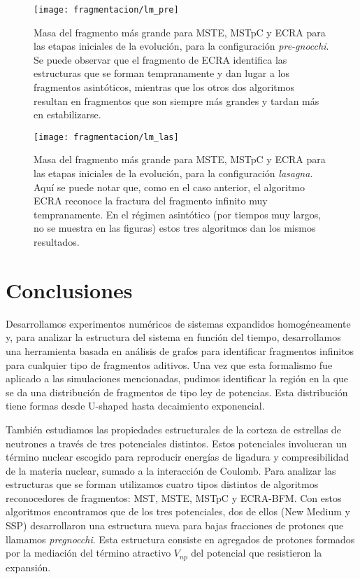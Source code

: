\begin{figure}[H]  \centering
  \texttt{[image: fragmentacion/lm\_pre]}
  \caption{Masa del fragmento más grande para MSTE, MSTpC y ECRA para las etapas iniciales de la evolución, para la configuración \emph{pre-gnocchi}.
    Se puede observar que el fragmento de ECRA identifica las estructuras que se forman tempranamente y dan lugar a los fragmentos asintóticos, mientras que los otros dos algoritmos resultan en fragmentos que son siempre más grandes y tardan más en estabilizarse.}
\label{fig:lm_pre}
\end{figure}

\begin{figure}[H]  \centering
  \texttt{[image: fragmentacion/lm\_las]}
  \caption{Masa del fragmento más grande para MSTE, MSTpC y ECRA para las etapas iniciales de la evolución, para la configuración \emph{lasagna}.
    Aquí se puede notar que, como en el caso anterior, el algoritmo ECRA reconoce la fractura del fragmento infinito muy tempranamente.
    En el régimen asintótico (por tiempos muy largos, no se muestra en las figuras) estos tres algoritmos dan los mismos resultados.}
\label{fig:lm_las}
\end{figure}


\section{Conclusiones}

Desarrollamos experimentos numéricos de sistemas expandidos homogéneamente y, para analizar la estructura del sistema en función del tiempo, desarrollamos una herramienta basada en análisis de grafos para identificar fragmentos infinitos para cualquier tipo de fragmentos aditivos.
Una vez que esta formalismo fue aplicado a las simulaciones mencionadas, pudimos identificar la región en la que se da una distribución de fragmentos de tipo ley de potencias.
Esta distribución tiene formas desde U-shaped hasta decaimiento exponencial.

También estudiamos las propiedades estructurales de la corteza de estrellas de neutrones a través de tres potenciales distintos.
Estos potenciales involucran un término nuclear escogido para reproducir energías de ligadura y compresibilidad de la materia nuclear, sumado a la interacción de Coulomb.
Para analizar las estructuras que se forman utilizamos cuatro tipos distintos de algoritmos reconocedores de fragmentos: MST, MSTE, MSTpC y ECRA-BFM.
Con estos algoritmos encontramos que de los tres potenciales, dos de ellos (New Medium y SSP) desarrollaron una estructura nueva para bajas fracciones de protones que llamamos \emph{pregnocchi}.
Esta estructura consiste en agregados de protones formados por la mediación del término atractivo $V_{np}$ del potencial que resistieron la expansión.

